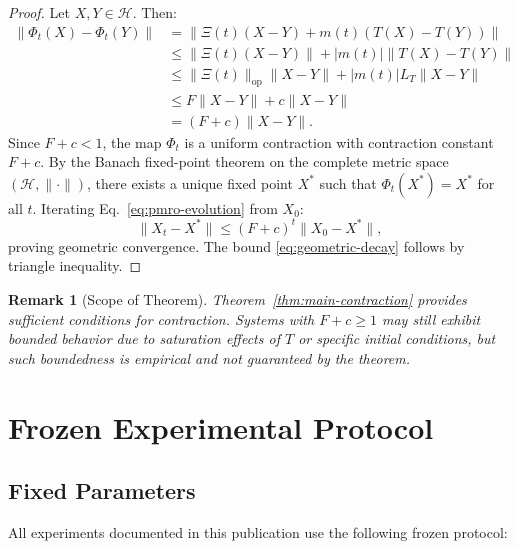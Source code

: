 \documentclass[11pt,a4paper]{article}
\newtheorem{remark}{Remark}
\begin{document}
\begin{proof}
Let \(X, Y \in \mathcal{H}\). Then:
\begin{align*}
\|\Phi_t(X) - \Phi_t(Y)\| &= \|\Xi(t)(X - Y) + m(t)(T(X) - T(Y))\| \\
&\leq \|\Xi(t)(X-Y)\| + |m(t)| \|T(X) - T(Y)\| \\
&\leq \|\Xi(t)\|_{\mathrm{op}} \|X - Y\| + |m(t)| L_T \|X - Y\| \\
&\leq F \|X - Y\| + c \|X - Y\| \\
&= (F + c) \|X - Y\|.
\end{align*}
Since \(F + c < 1\), the map \(\Phi_t\) is a uniform contraction with contraction constant \(F+c\). By the Banach fixed-point theorem on the complete metric space \((\mathcal{H}, \|\cdot\|)\), there exists a unique fixed point \(X^*\) such that \(\Phi_t(X^*) = X^*\) for all \(t\). Iterating Eq.~\eqref{eq:pmro-evolution} from \(X_0\):
\[
\|X_t - X^*\| \leq (F+c)^t \|X_0 - X^*\|,
\]
proving geometric convergence. The bound \eqref{eq:geometric-decay} follows by triangle inequality.
\end{proof}

\begin{remark}[Scope of Theorem]
Theorem~\ref{thm:main-contraction} provides \emph{sufficient} conditions for contraction. Systems with \(F+c \geq 1\) may still exhibit bounded behavior due to saturation effects of \(T\) or specific initial conditions, but such boundedness is empirical and not guaranteed by the theorem.
\end{remark}

\section{Frozen Experimental Protocol}

\subsection{Fixed Parameters}

All experiments documented in this publication use the following frozen protocol:
\end{document}
